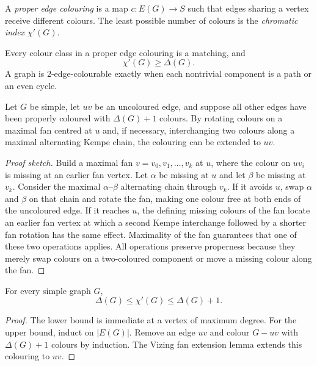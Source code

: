 \begin{notedefinition}
A \emph{proper edge colouring} is a map $c\colon E(G)\to S$ such that edges
sharing a vertex receive different colours.  The least possible number of
colours is the \emph{chromatic index} $\chi'(G)$.
\end{notedefinition}

\begin{noteremark}
Every colour class in a proper edge colouring is a matching, and
\[
  \chi'(G)\ge\Delta(G).
\]
A graph is $2$-edge-colourable exactly when each nontrivial component is a
path or an even cycle.
\end{noteremark}

\begin{notelemma}
Let $G$ be simple, let $uv$ be an uncoloured edge, and suppose all other edges
have been properly coloured with $\Delta(G)+1$ colours.  By rotating colours
on a maximal fan centred at $u$ and, if necessary, interchanging two colours
along a maximal alternating Kempe chain, the colouring can be extended to
$uv$.
\end{notelemma}
\begin{proof}[Proof sketch]
Build a maximal fan
$v=v_0,v_1,\dots,v_k$ at $u$, where the colour on $uv_i$ is missing at an
earlier fan vertex.  Let $\alpha$ be missing at $u$ and let $\beta$ be missing
at $v_k$.  Consider the maximal $\alpha$--$\beta$ alternating chain through
$v_k$.  If it avoids $u$, swap $\alpha$ and $\beta$ on that chain and rotate
the fan, making one colour free at both ends of the uncoloured edge.  If it
reaches $u$, the defining missing colours of the fan locate an earlier fan
vertex at which a second Kempe interchange followed by a shorter fan rotation
has the same effect.  Maximality of the fan guarantees that one of these two
operations applies.  All operations preserve properness because they merely
swap colours on a two-coloured component or move a missing colour along the
fan.
\end{proof}

\begin{notetheorem}
For every simple graph $G$,
\[
  \Delta(G)\le\chi'(G)\le\Delta(G)+1.
\]
\end{notetheorem}
\begin{proof}
The lower bound is immediate at a vertex of maximum degree.  For the upper
bound, induct on $|E(G)|$.  Remove an edge $uv$ and colour $G-uv$ with
$\Delta(G)+1$ colours by induction.  The Vizing fan extension lemma extends
this colouring to $uv$.
\end{proof}

